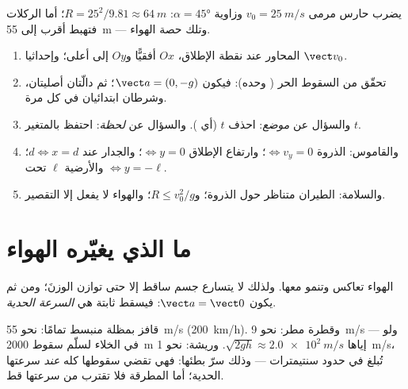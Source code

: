 \begin{example}\label{ex:g12:projectile-motion:kick}
يضرب حارس مرمى  $v_0 = \qty{25}{m/s}$ وزاوية $\alpha = \ang{45}$:
$R = 25^2/9.81 \approx \qty{64}{m}$؛ أما الركلات  فتهبط أقرب إلى
\qty{55}{m} --- وتلك حصة الهواء.
\end{example}

\begin{method}\label{met:g12:projectile-motion:method}
\begin{enumerate}
  \item المحاور عند نقطة الإطلاق، $Ox$ أفقيًّا و$Oy$ إلى أعلى؛ وإحداثيا
        $\vect v_0$.
  \item تحقّق من السقوط الحر ( وحده): فيكون $\vect a = (0,-g)$؛
        ثم دالّتان أصليتان، وشرطان ابتدائيان في كل مرة.
  \item والسؤال عن \emph{موضع}: احذف $t$ (أي ). والسؤال عن
        \emph{لحظة}: احتفظ بالمتغير $t$.
  \item والقاموس: الذروة $\Leftrightarrow v_y = 0$؛ وارتفاع الإطلاق
        $\Leftrightarrow y = 0$؛ والجدار عند $d \Leftrightarrow x = d$؛ والأرضية
        $\ell$ تحت $\Leftrightarrow y = -\ell$.
  \item والسلامة: الطيران متناظر حول الذروة؛ و$R \leq v_0^2/g$؛ والهواء
        لا يفعل إلا التقصير.
\end{enumerate}
\end{method}

\section{ما الذي يغيّره الهواء}

\begin{definition}\label{def:g12:projectile-motion:terminal}
 الهواء تعاكس  وتنمو معها. ولذلك لا يتسارع جسم
ساقط إلا حتى توازن  الوزنَ؛ ومن ثم يكون
$\vect a = \vect 0$: فيسقط  ثابتة هي \emph{السرعة
الحدية}.
\end{definition}

\begin{example}\label{ex:g12:projectile-motion:airorders}
قافز بمظلة منبسط تمامًا: نحو \qty{55}{m/s} (\qty{200}{km/h}). وقطرة مطر:
نحو \qty{9}{m/s} --- ولو في الخلاء لسلّم سقوط \qty{2000}{m} إياها 
$\sqrt{2gh} \approx \qty{2.0e2}{m/s}$. وريشة: نحو \qty{1}{m/s}،
تُبلغ في حدود سنتيمترات --- وذلك سرّ بطئها: فهي تقضي
سقوطها كله \emph{عند} سرعتها الحدية؛ أما المطرقة فلا تقترب من سرعتها قط.
\end{example}

